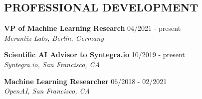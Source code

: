 \documentclass[10pt,centered]{./res} %
\begin{document}
\vspace*{-1.5cm}
\begin{resume}
\vspace{0.4cm}


\section{\color{ResumeBlue}PROFESSIONAL DEVELOPMENT}
{\bf VP of Machine Learning Research} \hfill04/2021 - present \\
{\it Merantix Labs, Berlin, Germany}

{\bf Scientific AI Advisor to Syntegra.io } \hfill10/2019 - present \\
{\it Syntegra.io, San Francisco, CA}

{\bf Machine Learning Researcher} \hfill06/2018 - 02/2021 \\
{\it OpenAI, San Francisco, CA}


\end{resume}
\end{document}
